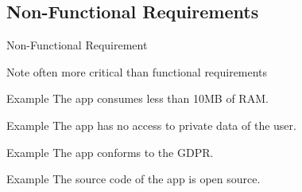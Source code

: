\subsection{Non-Functional Requirements}
\begin{frame}{\insertsubsection}
	\begin{fancycolumns}
		\begin{definition}{Non-Functional Requirement \mysource{\sommerville}}
		\end{definition}
		\begin{note}{Note}
			often more critical than functional requirements
		\end{note}
		\nextcolumn
		\begin{example}{Example}
			The app consumes less than 10MB of RAM.
		\end{example}
		\begin{example}{Example}
			The app has no access to private data of the user.
		\end{example}
		\begin{example}{Example}
			The app conforms to the GDPR. 
		\end{example}
		\begin{example}{Example}
			The source code of the app is open source.
		\end{example}
	\end{fancycolumns}
\end{frame}

\begin{frame}
	\centering
	\slideMindmapNonFunctionalRequirements
\end{frame}

